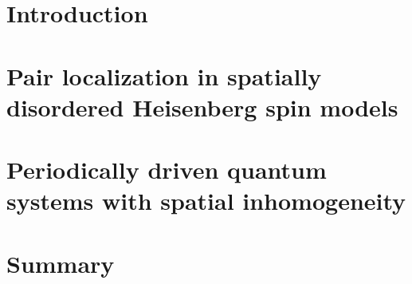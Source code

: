 \documentclass[ twoside,openright,titlepage,numbers=noenddot,%
                headinclude,footinclude,cleardoublepage=empty,abstract=on,
                BCOR=5mm,paper=a4,fontsize=11pt]{scrreprt}
\begin{document}
\frenchspacing
\raggedbottom
{} %
\pagestyle{plain}



\cleardoublepage
\cleardoublepage
\cleardoublepage
\cleardoublepage

\cleardoublepage
\pagestyle{scrheadings}
\cleardoublepage

\part{Introduction}


\part{Pair localization in spatially disordered Heisenberg spin models}\label{pt:spatial-disorder}









\part{Periodically driven quantum systems with spatial inhomogeneity}\label{pt:floquet}







\part{Summary}

\end{document}
